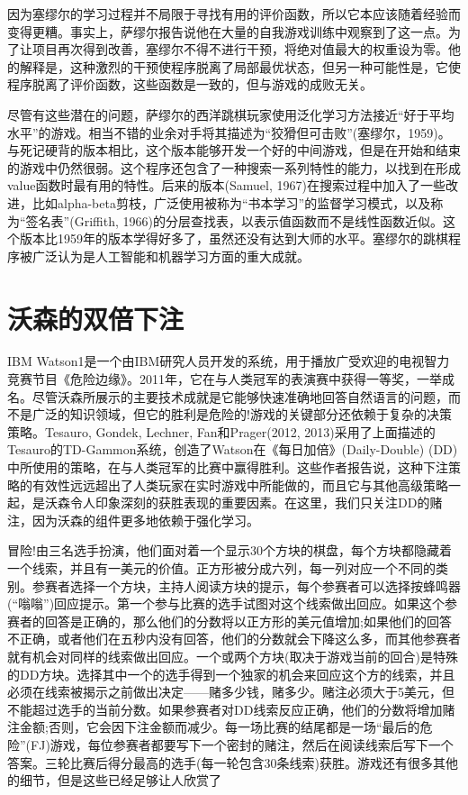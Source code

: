 因为塞缪尔的学习过程并不局限于寻找有用的评价函数，所以它本应该随着经验而变得更糟。事实上，萨缪尔报告说他在大量的自我游戏训练中观察到了这一点。为了让项目再次得到改善，塞缪尔不得不进行干预，将绝对值最大的权重设为零。他的解释是，这种激烈的干预使程序脱离了局部最优状态，但另一种可能性是，它使程序脱离了评价函数，这些函数是一致的，但与游戏的成败无关。

尽管有这些潜在的问题，萨缪尔的西洋跳棋玩家使用泛化学习方法接近“好于平均水平”的游戏。相当不错的业余对手将其描述为“狡猾但可击败”(塞缪尔，1959)。与死记硬背的版本相比，这个版本能够开发一个好的中间游戏，但是在开始和结束的游戏中仍然很弱。这个程序还包含了一种搜索一系列特性的能力，以找到在形成value函数时最有用的特性。后来的版本(Samuel, 1967)在搜索过程中加入了一些改进，比如alpha-beta剪枝，广泛使用被称为“书本学习”的监督学习模式，以及称为“签名表”(Griffith, 1966)的分层查找表，以表示值函数而不是线性函数近似。这个版本比1959年的版本学得好多了，虽然还没有达到大师的水平。塞缪尔的跳棋程序被广泛认为是人工智能和机器学习方面的重大成就。


\section{沃森的双倍下注}

IBM Watson1是一个由IBM研究人员开发的系统，用于播放广受欢迎的电视智力竞赛节目《危险边缘》。2011年，它在与人类冠军的表演赛中获得一等奖，一举成名。尽管沃森所展示的主要技术成就是它能够快速准确地回答自然语言的问题，而不是广泛的知识领域，但它的胜利是危险的!游戏的关键部分还依赖于复杂的决策策略。Tesauro, Gondek, Lechner, Fan和Prager(2012, 2013)采用了上面描述的Tesauro的TD-Gammon系统，创造了Watson在《每日加倍》(Daily-Double) (DD)中所使用的策略，在与人类冠军的比赛中赢得胜利。这些作者报告说，这种下注策略的有效性远远超出了人类玩家在实时游戏中所能做的，而且它与其他高级策略一起，是沃森令人印象深刻的获胜表现的重要因素。在这里，我们只关注DD的赌注，因为沃森的组件更多地依赖于强化学习。

冒险!由三名选手扮演，他们面对着一个显示30个方块的棋盘，每个方块都隐藏着一个线索，并且有一美元的价值。正方形被分成六列，每一列对应一个不同的类别。参赛者选择一个方块，主持人阅读方块的提示，每个参赛者可以选择按蜂鸣器(“嗡嗡”)回应提示。第一个参与比赛的选手试图对这个线索做出回应。如果这个参赛者的回答是正确的，那么他们的分数将以正方形的美元值增加;如果他们的回答不正确，或者他们在五秒内没有回答，他们的分数就会下降这么多，而其他参赛者就有机会对同样的线索做出回应。一个或两个方块(取决于游戏当前的回合)是特殊的DD方块。选择其中一个的选手得到一个独家的机会来回应这个方的线索，并且必须在线索被揭示之前做出决定——赌多少钱，赌多少。赌注必须大于5美元，但不能超过选手的当前分数。如果参赛者对DD线索反应正确，他们的分数将增加赌注金额;否则，它会因下注金额而减少。每一场比赛的结尾都是一场“最后的危险”(FJ)游戏，每位参赛者都要写下一个密封的赌注，然后在阅读线索后写下一个答案。三轮比赛后得分最高的选手(每一轮包含30条线索)获胜。游戏还有很多其他的细节，但是这些已经足够让人欣赏了

